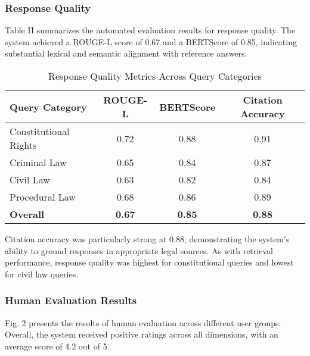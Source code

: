 \documentclass[conference]{IEEEtran}
\begin{document}
\subsubsection{Response Quality}

Table II summarizes the automated evaluation results for response quality. The system achieved a ROUGE-L score of 0.67 and a BERTScore of 0.85, indicating substantial lexical and semantic alignment with reference answers.

\begin{table}[ht]
\caption{Response Quality Metrics Across Query Categories}
\label{tab:response}
\begin{center}
\begin{tabular}{|l|c|c|c|}
\hline
\textbf{Query Category} & \textbf{ROUGE-L} & \textbf{BERTScore} & \textbf{Citation Accuracy} \\ \hline
Constitutional Rights & 0.72 & 0.88 & 0.91 \\ \hline
Criminal Law & 0.65 & 0.84 & 0.87 \\ \hline
Civil Law & 0.63 & 0.82 & 0.84 \\ \hline
Procedural Law & 0.68 & 0.86 & 0.89 \\ \hline
\textbf{Overall} & \textbf{0.67} & \textbf{0.85} & \textbf{0.88} \\ \hline
\end{tabular}
\end{center}
\end{table}

Citation accuracy was particularly strong at 0.88, demonstrating the system's ability to ground responses in appropriate legal sources. As with retrieval performance, response quality was highest for constitutional queries and lowest for civil law queries.

\subsubsection{Human Evaluation Results}

Fig. 2 presents the results of human evaluation across different user groups. Overall, the system received positive ratings across all dimensions, with an average score of 4.2 out of 5.
\end{document}
